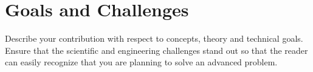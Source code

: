 \section{Goals and Challenges}

Describe your contribution with respect to concepts, theory and technical goals.
Ensure that the scientific and engineering challenges stand out so that the reader can easily recognize that you are planning to solve an advanced problem.
